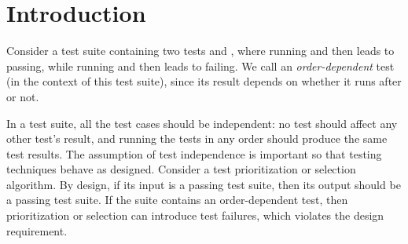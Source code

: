\section{Introduction}


Consider a test suite containing two tests 
and , where running  and then  leads
to  passing, while running  and then
 leads to  failing. We call 
an \textit{order-dependent} test (in the context of this test suite), since its result depends on
whether it runs after  or not.



In a test suite, all the test cases should be independent:
no test should affect any other test's result, and
running the tests in any order should produce the same test results.
The assumption of test independence 
is important so that testing techniques behave
as designed.
Consider a test prioritization or selection algorithm.  By design, if its
input is a passing test suite, then its output should be a passing test
suite.  If the suite contains an order-dependent test, then prioritization
or selection can introduce test failures, which violates the design
requirement.

